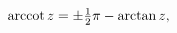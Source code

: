 \[\mathop{\mathrm{arccot}\/}\nolimits z=\pm\tfrac{1}{2}\pi-\mathop{\mathrm{%
arctan}\/}\nolimits z,\]